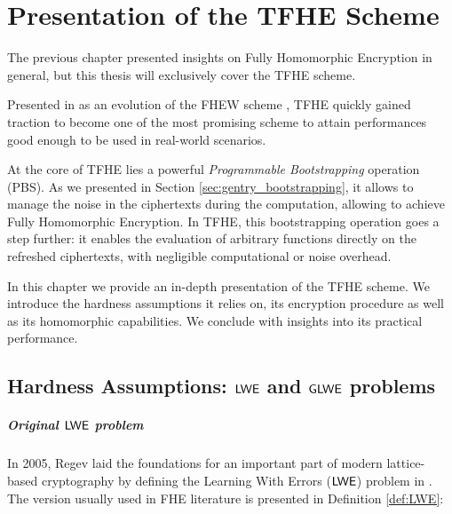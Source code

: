 
\chapter{Presentation of the TFHE Scheme}

The previous chapter presented insights on Fully Homomorphic Encryption in general, but this thesis will exclusively cover the TFHE scheme.

Presented in \cite{JC:CGGI20, these_chillotti} as an evolution of the FHEW scheme \cite{EC:DucMic15}, TFHE quickly gained traction to become one of the most promising scheme to attain performances good enough to be  used in real-world scenarios. 

At the core of TFHE lies a powerful \textit{Programmable Bootstrapping} operation (PBS). As we presented in Section \ref{sec:gentry_bootstrapping}, it allows to manage the noise in the ciphertexts during the computation, allowing to achieve Fully Homomorphic Encryption. In TFHE, this bootstrapping operation goes a step further: it enables the evaluation of arbitrary functions directly on the refreshed ciphertexts, with negligible computational or noise overhead.

In this chapter we provide an in-depth presentation of the TFHE scheme. We introduce the hardness assumptions it relies on, its encryption procedure as well as its homomorphic capabilities. We conclude with insights into its practical performance.

\section{Hardness Assumptions: $\textsf{LWE}$ and $\textsf{GLWE}$ problems}
\label{sec:hardness_assumptions}


\paragraph{Original $\textsf{LWE}$ problem}

In 2005, Regev laid the foundations for an important part of modern lattice-based cryptography by defining the Learning With Errors ($\textsf{LWE}$) problem in \cite{regev_lwe}. The version usually used in FHE literature is presented in Definition \ref{def:LWE}:



